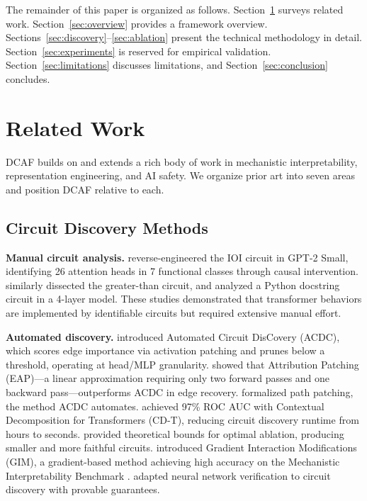 \documentclass[11pt]{article}
\begin{document}
The remainder of this paper is organized as follows. Section~\ref{sec:related} surveys related work. Section~\ref{sec:overview} provides a framework overview. Sections~\ref{sec:discovery}--\ref{sec:ablation} present the technical methodology in detail. Section~\ref{sec:experiments} is reserved for empirical validation. Section~\ref{sec:limitations} discusses limitations, and Section~\ref{sec:conclusion} concludes.


\section{Related Work}
\label{sec:related}

DCAF builds on and extends a rich body of work in mechanistic interpretability, representation engineering, and AI safety. We organize prior art into seven areas and position DCAF relative to each.

\subsection{Circuit Discovery Methods}

\textbf{Manual circuit analysis.} \citet{wang2023ioi} reverse-engineered the IOI circuit in GPT-2 Small, identifying 26 attention heads in 7 functional classes through causal intervention. \citet{hanna2023greaterthan} similarly dissected the greater-than circuit, and \citet{heimersheim2023docstring} analyzed a Python docstring circuit in a 4-layer model. These studies demonstrated that transformer behaviors are implemented by identifiable circuits but required extensive manual effort.

\textbf{Automated discovery.} \citet{conmy2023acdc} introduced Automated Circuit DisCovery (ACDC), which scores edge importance via activation patching and prunes below a threshold, operating at head/MLP granularity. \citet{syed2024attribution} showed that Attribution Patching (EAP)---a linear approximation requiring only two forward passes and one backward pass---outperforms ACDC in edge recovery. \citet{goldowsky2023path} formalized path patching, the method ACDC automates. \citet{hsu2025cdt} achieved 97\% ROC AUC with Contextual Decomposition for Transformers (CD-T), reducing circuit discovery runtime from hours to seconds. \citet{li2024optimal} provided theoretical bounds for optimal ablation, producing smaller and more faithful circuits. \citet{edin2025gim} introduced Gradient Interaction Modifications (GIM), a gradient-based method achieving high accuracy on the Mechanistic Interpretability Benchmark \citep{mueller2025mib}. \citet{hadad2026formal} adapted neural network verification to circuit discovery with provable guarantees.
\end{document}
